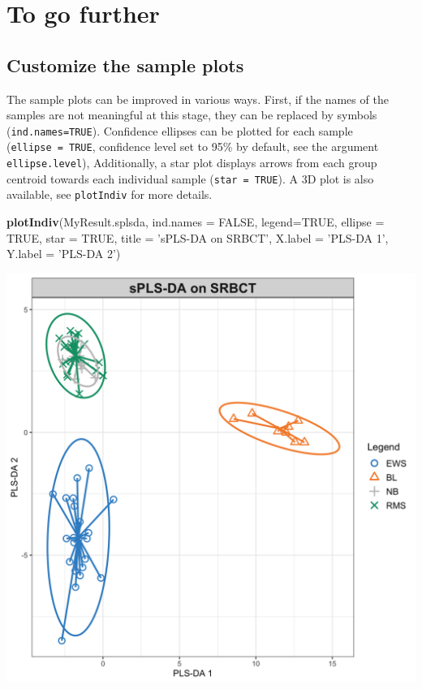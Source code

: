 \documentclass[]{book}
\newenvironment{Shaded}{\begin{snugshade}}{\end{snugshade}}
\newcommand{\DataTypeTok}[1]{\textcolor[rgb]{0.13,0.29,0.53}{#1}}
\newcommand{\KeywordTok}[1]{\textcolor[rgb]{0.13,0.29,0.53}{\textbf{#1}}}
\newcommand{\NormalTok}[1]{#1}
\newcommand{\OtherTok}[1]{\textcolor[rgb]{0.56,0.35,0.01}{#1}}
\newcommand{\StringTok}[1]{\textcolor[rgb]{0.31,0.60,0.02}{#1}}
\begin{document}
\hypertarget{plsda-tgf}{%
\section{To go further}\label{plsda-tgf}}

\hypertarget{splsda:plotIndiv}{%
\subsection{Customize the sample plots}\label{splsda:plotIndiv}}

The sample plots can be improved in various ways. First, if the names of the samples are not meaningful at this stage, they can be replaced by symbols (\texttt{ind.names=TRUE}). Confidence ellipses can be plotted for each sample (\texttt{ellipse\ =\ TRUE}, confidence level set to 95\% by default, see the argument \texttt{ellipse.level}), Additionally, a star plot displays arrows from each group centroid towards each individual sample (\texttt{star\ =\ TRUE}). A 3D plot is also available, see \texttt{plotIndiv} for more details.

\begin{Shaded}
\begin{Highlighting}[]
\KeywordTok{plotIndiv}\NormalTok{(MyResult.splsda, }\DataTypeTok{ind.names =} \OtherTok{FALSE}\NormalTok{, }\DataTypeTok{legend=}\OtherTok{TRUE}\NormalTok{,}
          \DataTypeTok{ellipse =} \OtherTok{TRUE}\NormalTok{, }\DataTypeTok{star =} \OtherTok{TRUE}\NormalTok{, }\DataTypeTok{title =} \StringTok{'sPLS-DA on SRBCT'}\NormalTok{,}
          \DataTypeTok{X.label =} \StringTok{'PLS-DA 1'}\NormalTok{, }\DataTypeTok{Y.label =} \StringTok{'PLS-DA 2'}\NormalTok{)}
\end{Highlighting}
\end{Shaded}

\begin{center}\includegraphics[width=0.75\linewidth,]{Figures/04-plsda-plotindiv-args-1} \end{center}
\end{document}
